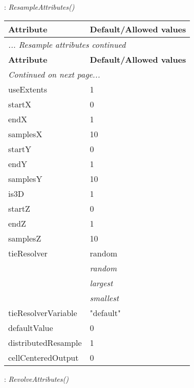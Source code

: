 \documentclass[10pt,a4paper]{report}
\begin{document}
{}
: {\it ResampleAttributes() }\\[-3mm]

\begin{longtable}{ll}
{\bf Attribute} & {\bf Default/Allowed values} \\
\hline \hline
\endfirsthead
\multicolumn{2}{l}{{\it ... Resample attributes continued}} \\
{\bf Attribute} & {\bf Default/Allowed values} \\
\hline \hline
\endhead
\hline
\multicolumn{2}{l}{{\it Continued on next page...}} \\
\endfoot
\hline
\endlastfoot

useExtents  &  1 \\
startX  &  0 \\
endX  &  1 \\
samplesX  &  10 \\
startY  &  0 \\
endY  &  1 \\
samplesY  &  10 \\
is3D  &  1 \\
startZ  &  0 \\
endZ  &  1 \\
samplesZ  &  10 \\
tieResolver  &  random   \\
 & {\it  random} \\
 & {\it  largest} \\
 & {\it  smallest} \\
tieResolverVariable  &  "default" \\
defaultValue  &  0 \\
distributedResample  &  1 \\
cellCenteredOutput  &  0 \\
\end{longtable}

\newpage

{}
: {\it RevolveAttributes() }\\[-3mm]
\end{document}
